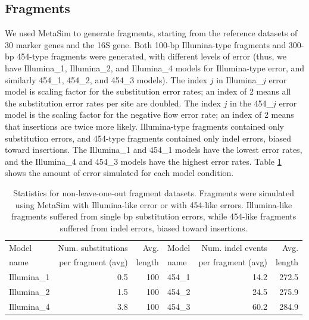 \subsection{Fragments}
We used MetaSim \cite{Richter2008} to 
generate fragments, starting from the reference
datasets of
 30 marker genes and the 16S gene.
Both 100-bp Illumina-type fragments and 
300-bp 454-type fragments were generated,
with different levels of error (thus, we have Illumina\_1, Illumina\_2,
and
Illumina\_4 models for Illumina-type error, and similarly
454\_1, 454\_2, and 454\_3 models).  The index $j$ in Illumina\_$j$ error model is scaling factor
for the substitution error rates; an index of 2 means all the substitution error rates per site
are doubled.  The index $j$ in the 454\_$j$ error model is the scaling factor for the negative flow error rate; an index of 2 means that insertions are twice more likely.
Illumina-type fragments contained only substitution errors,
and  454-type fragments contained only indel errors, biased toward insertions.
The Illumina\_1  and 454\_1 models
have the lowest error rates, and the
Illumina\_4 and 454\_3 models have
the highest error rates.  
Table \ref{tipp:metasim_stats} shows the amount of error simulated for each model condition. 

\begin{table}[h]
\caption[Higher error fragment statistics.]{\label{tipp:metasim_stats}Statistics for non-leave-one-out fragment datasets.  
Fragments were simulated using MetaSim with Illumina-like error or 
with 454-like errors.  %
Illumina-like fragments suffered from single bp substitution errors, while 454-like fragments suffered from indel errors, biased toward insertions. }  %
\begin{center}
\begin{tabular}{|l|r|r||l|r|r|}
\hline
Model &  Num. substitutions &  Avg.  & Model  & Num. indel events &  Avg.  \\
name&   per fragment (avg) &       length&         name &  per fragment (avg) &  length \\
\hline
Illumina\_1 & 0.5                          & 100                   & 454\_1      & 14.2                        & 272.5                    \\ 
Illumina\_2 & 1.5                          & 100                    &454\_2      & 24.5                        & 275.9                    \\ 
Illumina\_4 & 3.8                          & 100                    &454\_3      & 60.2                        & 284.9                    \\ 
\hline
\end{tabular}
\end{center}
\end{table}
\newpage
